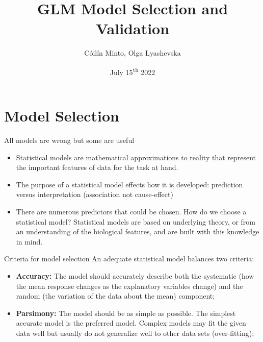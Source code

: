 \documentclass{beamer}
\title{GLM Model Selection and Validation}
\author{Cóilín Minto, Olga Lyashevska}
\date{July 15\textsuperscript{th} 2022}
\institute{Marine and Freshwater Research Centre\\ Atlantic Technological University \\ Galway, Ireland}
\begin{document}
\begin{frame}
 \maketitle
\end{frame}

\section{Model Selection}

\begin{frame}{All models are wrong but some are useful}{}

\begin{itemize}
\item Statistical models are mathematical approximations to reality that represent the important features of data for the
task at hand.
\pause
\item The purpose of a statistical model effects how it is developed: prediction versus interpretation (association not cause-effect)
\pause
\item There are numerous predictors that could be chosen. How do we choose a statistical model? Statistical models are based on underlying theory, or from an understanding of the biological features, and are built with this knowledge in mind. 
\end{itemize}

\end{frame}

\begin{frame}{Criteria for model selection}{}
An adequate statistical model balances two criteria:
\begin{itemize}
\item \textbf{Accuracy:} The model should accurately describe both the systematic (how the mean response changes as the explanatory variables change) and the random  (the variation of the data about the mean) component;  
\pause
\item \textbf{Parsimony:} The model should be as simple as possible. The simplest accurate model is the preferred model. Complex models may fit the given data well but usually do not generalize well to other data sets (over-fitting);
\end{itemize}
\end{frame}
\end{document}
